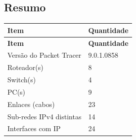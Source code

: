 \subsection{Resumo}
\begingroup\scriptsize\setlength{\tabcolsep}{3pt}
\begin{longtable}{@{}p{}p{}@{}}
\toprule \textbf{Item} & \textbf{Quantidade} \\\midrule\endfirsthead
\toprule \textbf{Item} & \textbf{Quantidade} \\\midrule\endhead
Versão do Packet Tracer & 9.0.1.0858 \\
Roteador(s) & 8 \\
Switch(s) & 4 \\
PC(s) & 9 \\
Enlaces (cabos) & 23 \\
Sub-redes IPv4 distintas & 14 \\
Interfaces com IP & 24 \\
\bottomrule
\end{longtable}\endgroup

